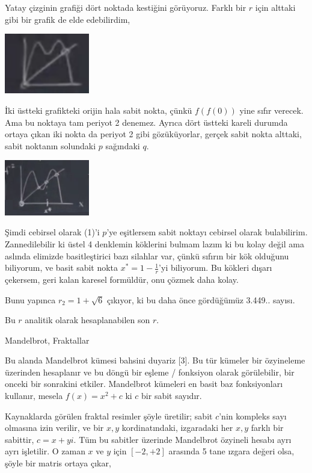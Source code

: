 \documentclass[12pt,fleqn]{article}\usepackage{../../common}
\begin{document}
Yatay çizginin grafiği dört noktada kestiğini görüyoruz. Farklı bir $r$
için alttaki gibi bir grafik de elde edebilirdim,

\includegraphics[width=10em]{19_17.png}

İki üstteki grafikteki orijin hala sabit nokta, çünkü $f(f(0))$ yine sıfır
verecek. Ama bu noktaya tam periyot 2 denemez. Ayrıca dört üstteki kareli
durumda ortaya çıkan iki nokta da periyot 2 gibi gözüküyorlar, gerçek sabit
nokta alttaki, sabit noktanın solundaki $p$ sağındaki $q$. 

\includegraphics[width=10em]{19_18.png}

Şimdi cebirsel olarak (1)'i $p$'ye eşitlersem sabit noktayı cebirsel olarak
bulabilirim. Zannedilebilir ki üstel 4 denklemin köklerini bulmam lazım ki
bu kolay değil ama aslında elimizde basitleştirici bazı silahlar var, çünkü
sıfırın bir kök olduğunu biliyorum, ve basit sabit nokta
$x^* = 1-\frac{1}{r}$'yi biliyorum. Bu kökleri dışarı çekersem, geri kalan
karesel formüldür, onu çözmek daha kolay.

Bunu yapınca $r_2 = 1+\sqrt{6}$ çıkıyor, ki bu daha önce gördüğümüz
3.449.. sayısı.

Bu $r$ analitik olarak hesaplanabilen son $r$. 

Mandelbrot, Fraktallar

Bu alanda Mandelbrot kümesi bahsini duyariz [3]. Bu tür kümeler bir özyineleme
üzerinden hesaplanır ve bu döngü bir eşleme / fonksiyon olarak görülebilir, bir
onceki bir sonrakini etkiler. Mandelbrot kümeleri en basit baz fonksiyonları
kullanır, mesela $f(x) = x^2 + c$ ki $c$ bir sabit sayıdır.

Kaynaklarda görülen fraktal resimler şöyle üretilir; sabit $c$'nin kompleks sayı
olmasına izin verilir, ve bir $x,y$ kordinatındaki, izgaradaki her $x,y$ farklı
bir sabittir, $c = x + y i$. Tüm bu sabitler üzerinde Mandelbrot özyineli hesabı
ayrı ayrı işletilir. O zaman $x$ ve $y$ için $[-2,+2]$ arasında 5 tane ızgara
değeri olsa, şöyle bir matris ortaya çıkar,
\end{document}
